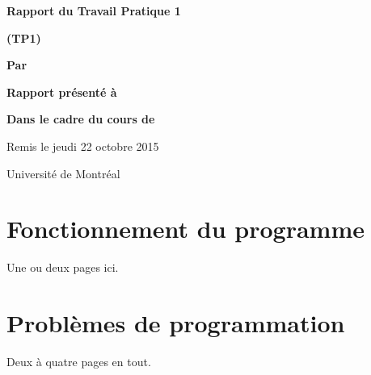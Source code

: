 \documentclass[letterpaper,12pt]{scrartcl}
\begin{document}
	\begin{center}
		\vspace{2cm}

		{\Huge\bf\sf Rapport du Travail Pratique 1}

		\vspace{0.5cm}

		{\bf\sf (TP1)}

		\vspace{4cm}

		{\bf\sf Par}

		\vspace{0.5cm}{\large\bf\sf Sulliman Aïad et François Poitras}

		\vspace{2cm}

		{\bf\sf Rapport présenté à}

		\vspace{0.5cm}{\large\bf\sf M. Marc  Feeley}

		\vspace{2cm}

		{\bf\sf Dans le cadre du cours de}

		\vspace{0.5cm}{\large\bf\sf Concepts des langages de programmation (IFT2035)}

		\vspace{\fill}
		Remis le jeudi 22 octobre 2015

		\vspace{0.5cm}Université de Montréal
	\end{center}
	
	\newpage

	\pagestyle{cb}
	
	\tableofcontents

	\newpage
	
	\section{Fonctionnement du programme}
		 Une ou deux pages ici.
			
	
    
	\section{Problèmes de programmation}
        Deux à quatre pages en tout.
        
\end{document}
